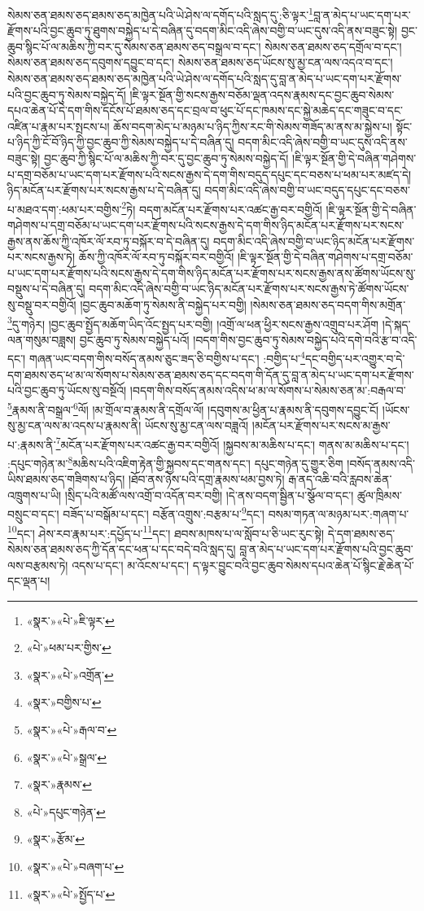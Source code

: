 སེམས་ཅན་ཐམས་ཅད་ཐམས་ཅད་མཁྱེན་པའི་ཡེ་ཤེས་ལ་དགོད་པའི་སླད་དུ་:ཅི་ལྟར་\footnote{«སྣར་»«པེ་»ཇི་ལྟར་}བླ་ན་མེད་པ་ཡང་དག་པར་རྫོགས་པའི་བྱང་ཆུབ་ཏུ་ཐུགས་བསྐྱེད་པ་དེ་བཞིན་དུ་བདག་མིང་འདི་ཞེས་བགྱི་བ་ཡང་དུས་འདི་ནས་བཟུང་སྟེ། བྱང་ཆུབ་སྙིང་པོ་ལ་མཆིས་ཀྱི་བར་དུ་སེམས་ཅན་ཐམས་ཅད་བསྒྲལ་བ་དང་། སེམས་ཅན་ཐམས་ཅད་དགྲོལ་བ་དང་། སེམས་ཅན་ཐམས་ཅད་དབུགས་དབྱུང་བ་དང་། སེམས་ཅན་ཐམས་ཅད་ཡོངས་སུ་མྱ་ངན་ལས་འདའ་བ་དང་། སེམས་ཅན་ཐམས་ཅད་ཐམས་ཅད་མཁྱེན་པའི་ཡེ་ཤེས་ལ་དགོད་པའི་སླད་དུ་བླ་ན་མེད་པ་ཡང་དག་པར་རྫོགས་པའི་བྱང་ཆུབ་ཏུ་སེམས་བསྐྱེད་དོ། །ཇི་ལྟར་སྔོན་གྱི་སངས་རྒྱས་བཅོམ་ལྡན་འདས་རྣམས་དང་བྱང་ཆུབ་སེམས་དཔའ་ཆེན་པོ་དེ་དག་གིས་དངོས་པོ་ཐམས་ཅད་དང་བྲལ་བ་ཕུང་པོ་དང་ཁམས་དང་སྐྱེ་མཆེད་དང་གཟུང་བ་དང་འཛིན་པ་རྣམ་པར་སྤངས་པ། ཆོས་བདག་མེད་པ་མཉམ་པ་ཉིད་ཀྱིས་རང་གི་སེམས་གཟོད་མ་ནས་མ་སྐྱེས་པ། སྟོང་པ་ཉིད་ཀྱི་ངོ་བོ་ཉིད་ཀྱི་བྱང་ཆུབ་ཀྱི་སེམས་བསྐྱེད་པ་དེ་བཞིན་དུ། བདག་མིང་འདི་ཞེས་བགྱི་བ་ཡང་དུས་འདི་ནས་བཟུང་སྟེ། བྱང་ཆུབ་ཀྱི་སྙིང་པོ་ལ་མཆིས་ཀྱི་བར་དུ་བྱང་ཆུབ་ཏུ་སེམས་བསྐྱེད་དོ། །ཇི་ལྟར་སྔོན་གྱི་དེ་བཞིན་གཤེགས་པ་དགྲ་བཅོམ་པ་ཡང་དག་པར་རྫོགས་པའི་སངས་རྒྱས་དེ་དག་གིས་བདུད་དཔུང་དང་བཅས་པ་ཕམ་པར་མཛད་དེ། ཉིད་མངོན་པར་རྫོགས་པར་སངས་རྒྱས་པ་དེ་བཞིན་དུ། བདག་མིང་འདི་ཞེས་བགྱི་བ་ཡང་བདུད་དཔུང་དང་བཅས་པ་མཐའ་དག་:ཕམ་པར་བགྱིས་\footnote{«པེ་»ཕམ་པར་གྱིས་}ཏེ། བདག་མངོན་པར་རྫོགས་པར་འཚང་རྒྱ་བར་བགྱིའོ། །ཇི་ལྟར་སྔོན་གྱི་དེ་བཞིན་གཤེགས་པ་དགྲ་བཅོམ་པ་ཡང་དག་པར་རྫོགས་པའི་སངས་རྒྱས་དེ་དག་གིས་ཉིད་མངོན་པར་རྫོགས་པར་སངས་རྒྱས་ནས་ཆོས་ཀྱི་འཁོར་ལོ་རབ་ཏུ་བསྐོར་བ་དེ་བཞིན་དུ། བདག་མིང་འདི་ཞེས་བགྱི་བ་ཡང་ཉིད་མངོན་པར་རྫོགས་པར་སངས་རྒྱས་ཏེ། ཆོས་ཀྱི་འཁོར་ལོ་རབ་ཏུ་བསྐོར་བར་བགྱིའོ། །ཇི་ལྟར་སྔོན་གྱི་དེ་བཞིན་གཤེགས་པ་དགྲ་བཅོམ་པ་ཡང་དག་པར་རྫོགས་པའི་སངས་རྒྱས་དེ་དག་གིས་ཉིད་མངོན་པར་རྫོགས་པར་སངས་རྒྱས་ནས་ཚོགས་ཡོངས་སུ་བསྡུས་པ་དེ་བཞིན་དུ། བདག་མིང་འདི་ཞེས་བགྱི་བ་ཡང་ཉིད་མངོན་པར་རྫོགས་པར་སངས་རྒྱས་ཏེ་ཚོགས་ཡོངས་སུ་བསྡུ་བར་བགྱིའོ། །བྱང་ཆུབ་མཆོག་ཏུ་སེམས་ནི་བསྐྱེད་པར་བགྱི། །སེམས་ཅན་ཐམས་ཅད་བདག་གིས་མགྲོན་\footnote{«སྣར་»«པེ་»འགྲོན་}དུ་གཉེར། །བྱང་ཆུབ་སྤྱོད་མཆོག་ཡིད་འོང་སྤྱད་པར་བགྱི། །འགྲོ་ལ་ཕན་ཕྱིར་སངས་རྒྱས་འགྲུབ་པར་ཤོག །དེ་སྐད་ལན་གསུམ་བཟླས། བྱང་ཆུབ་ཏུ་སེམས་བསྐྱེད་པའོ། །བདག་གིས་བྱང་ཆུབ་ཏུ་སེམས་བསྐྱེད་པའི་དགེ་བའི་རྩ་བ་འདི་དང་། གཞན་ཡང་བདག་གིས་བསོད་ནམས་ཅུང་ཟད་ཅི་བགྱིས་པ་དང་། :བགྱིད་པ་\footnote{«སྣར་»བགྱིས་པ་}དང་བགྱིད་པར་འགྱུར་བ་དེ་དག་ཐམས་ཅད་ཕ་མ་ལ་སོགས་པ་སེམས་ཅན་ཐམས་ཅད་དང་བདག་གི་དོན་དུ་བླ་ན་མེད་པ་ཡང་དག་པར་རྫོགས་པའི་བྱང་ཆུབ་ཏུ་ཡོངས་སུ་བསྔོའོ། །བདག་གིས་བསོད་ནམས་འདིས་ཕ་མ་ལ་སོགས་པ་སེམས་ཅན་མ་:བརྒལ་བ་\footnote{«སྣར་»«པེ་»རྒལ་བ་}རྣམས་ནི་བསྒྲལ་\footnote{«སྣར་»«པེ་»སྒྲལ་}ལོ། །མ་གྲོལ་བ་རྣམས་ནི་དགྲོལ་ལོ། །དབུགས་མ་ཕྱིན་པ་རྣམས་ནི་དབུགས་དབྱུང་ངོ། །ཡོངས་སུ་མྱ་ངན་ལས་མ་འདས་པ་རྣམས་ནི། ཡོངས་སུ་མྱ་ངན་ལས་བཟླའོ། །མངོན་པར་རྫོགས་པར་སངས་མ་རྒྱས་པ་:རྣམས་ནི་\footnote{«སྣར་»རྣམས་}མངོན་པར་རྫོགས་པར་འཚང་རྒྱ་བར་བགྱིའོ། །སྐྱབས་མ་མཆིས་པ་དང་། གནས་མ་མཆིས་པ་དང་། :དཔུང་གཉེན་མ་\footnote{«པེ་»དཔུང་གཉེན་}མཆིས་པའི་འཇིག་རྟེན་གྱི་སྐྱབས་དང་གནས་དང་། དཔུང་གཉེན་དུ་གྱུར་ཅིག །བསོད་ནམས་འདི་ཡིས་ཐམས་ཅད་གཟིགས་པ་ཉིད། །ཐོབ་ནས་ཉེས་པའི་དགྲ་རྣམས་ཕམ་བྱས་ཏེ། རྒ་ནད་འཆི་བའི་རླབས་ཆེན་འཁྲུགས་པ་ཡི། །སྲིད་པའི་མཚོ་ལས་འགྲོ་བ་འདོན་བར་བགྱི། །དེ་ནས་བདག་སྦྱིན་པ་སྩོལ་བ་དང་། ཚུལ་ཁྲིམས་བསྲུང་བ་དང་། བཟོད་པ་བསྒོམ་པ་དང་། བརྩོན་འགྲུས་:བརྩམ་པ་\footnote{«སྣར་»རྩོམ་}དང་། བསམ་གཏན་ལ་མཉམ་པར་:གཞག་པ་\footnote{«སྣར་»«པེ་»བཞག་པ་}དང་། ཤེས་རབ་རྣམ་པར་:དཔྱོད་པ་\footnote{«སྣར་»«པེ་»སྤྱོད་པ་}དང་། ཐབས་མཁས་པ་ལ་སློབ་པ་ཅི་ཡང་རུང་སྟེ། དེ་དག་ཐམས་ཅད་སེམས་ཅན་ཐམས་ཅད་ཀྱི་དོན་དང་ཕན་པ་དང་བདེ་བའི་སླད་དུ། བླ་ན་མེད་པ་ཡང་དག་པར་རྫོགས་པའི་བྱང་ཆུབ་ལས་བརྩམས་ཏེ། འདས་པ་དང་། མ་འོངས་པ་དང་། ད་ལྟར་བྱུང་བའི་བྱང་ཆུབ་སེམས་དཔའ་ཆེན་པོ་སྙིང་རྗེ་ཆེན་པོ་དང་ལྡན་པ། 